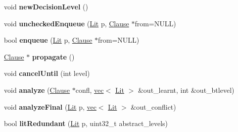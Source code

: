 \begin{DoxyCompactItemize}
\item 
\hypertarget{classminisat_1_1Solver_a1bdb9047759bacc841b8b51c8bf55728}{void {\bfseries new\-Decision\-Level} ()}\label{classminisat_1_1Solver_a1bdb9047759bacc841b8b51c8bf55728}

\item 
\hypertarget{classminisat_1_1Solver_a66e329bbd1e82d0bc4ecf701c796e81e}{void {\bfseries unchecked\-Enqueue} (\hyperlink{classminisat_1_1Lit}{\-Lit} p, \hyperlink{classminisat_1_1Clause}{\-Clause} $\ast$from=\-N\-U\-L\-L)}\label{classminisat_1_1Solver_a66e329bbd1e82d0bc4ecf701c796e81e}

\item 
\hypertarget{classminisat_1_1Solver_a212330717b0a35e5d60edc878ba0b64c}{bool {\bfseries enqueue} (\hyperlink{classminisat_1_1Lit}{\-Lit} p, \hyperlink{classminisat_1_1Clause}{\-Clause} $\ast$from=\-N\-U\-L\-L)}\label{classminisat_1_1Solver_a212330717b0a35e5d60edc878ba0b64c}

\item 
\hypertarget{classminisat_1_1Solver_a85edcbe8e98f7f07f23717afa9e154d8}{\hyperlink{classminisat_1_1Clause}{\-Clause} $\ast$ {\bfseries propagate} ()}\label{classminisat_1_1Solver_a85edcbe8e98f7f07f23717afa9e154d8}

\item 
\hypertarget{classminisat_1_1Solver_a2fb2d91a89d728cdf90f04703d2f51d7}{void {\bfseries cancel\-Until} (int level)}\label{classminisat_1_1Solver_a2fb2d91a89d728cdf90f04703d2f51d7}

\item 
\hypertarget{classminisat_1_1Solver_ad1f4a3bb135e0e6aac4a78e1eb7da1bc}{void {\bfseries analyze} (\hyperlink{classminisat_1_1Clause}{\-Clause} $\ast$confl, \hyperlink{classvec}{vec}$<$ \hyperlink{classminisat_1_1Lit}{\-Lit} $>$ \&out\-\_\-learnt, int \&out\-\_\-btlevel)}\label{classminisat_1_1Solver_ad1f4a3bb135e0e6aac4a78e1eb7da1bc}

\item 
\hypertarget{classminisat_1_1Solver_a846b00fd76a19f9d37bacd5449287e79}{void {\bfseries analyze\-Final} (\hyperlink{classminisat_1_1Lit}{\-Lit} p, \hyperlink{classvec}{vec}$<$ \hyperlink{classminisat_1_1Lit}{\-Lit} $>$ \&out\-\_\-conflict)}\label{classminisat_1_1Solver_a846b00fd76a19f9d37bacd5449287e79}

\item 
\hypertarget{classminisat_1_1Solver_a34c914a297ff193536e38d0e93929b68}{bool {\bfseries lit\-Redundant} (\hyperlink{classminisat_1_1Lit}{\-Lit} p, uint32\-\_\-t abstract\-\_\-levels)}\label{classminisat_1_1Solver_a34c914a297ff193536e38d0e93929b68}


\end{DoxyCompactItemize}
